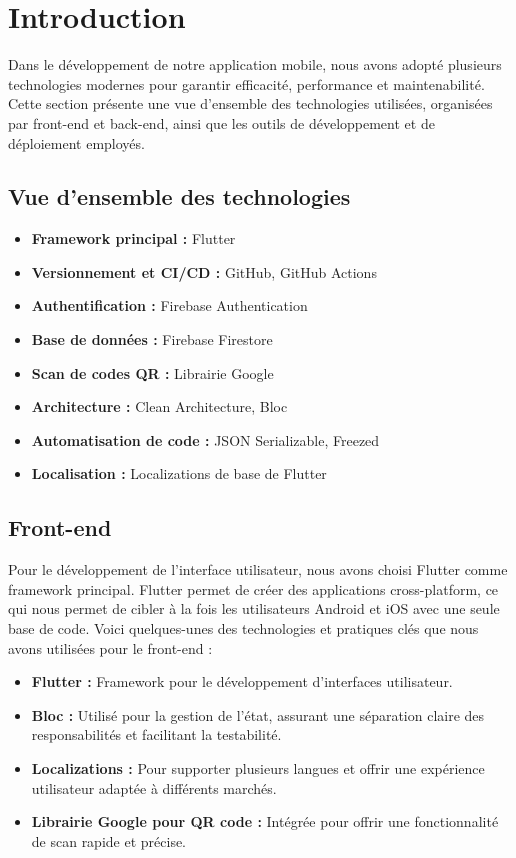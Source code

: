 \section{Introduction}

Dans le développement de notre application mobile, nous avons adopté plusieurs technologies modernes pour garantir efficacité, performance et maintenabilité. Cette section présente une vue d'ensemble des technologies utilisées, organisées par front-end et back-end, ainsi que les outils de développement et de déploiement employés.

\subsection{Vue d'ensemble des technologies}

\begin{itemize}[noitemsep]
    \item \textbf{Framework principal :} Flutter
    \item \textbf{Versionnement et CI/CD :} GitHub, GitHub Actions
    \item \textbf{Authentification :} Firebase Authentication
    \item \textbf{Base de données :} Firebase Firestore
    \item \textbf{Scan de codes QR :} Librairie Google
    \item \textbf{Architecture :} Clean Architecture, Bloc
    \item \textbf{Automatisation de code :} JSON Serializable, Freezed
    \item \textbf{Localisation :} Localizations de base de Flutter
\end{itemize}

\subsection{Front-end}

Pour le développement de l'interface utilisateur, nous avons choisi Flutter comme framework principal. Flutter permet de créer des applications cross-platform, ce qui nous permet de cibler à la fois les utilisateurs Android et iOS avec une seule base de code. Voici quelques-unes des technologies et pratiques clés que nous avons utilisées pour le front-end :

\begin{itemize}[noitemsep]
    \item \textbf{Flutter :} Framework pour le développement d'interfaces utilisateur.
    \item \textbf{Bloc :} Utilisé pour la gestion de l'état, assurant une séparation claire des responsabilités et facilitant la testabilité.
    \item \textbf{Localizations :} Pour supporter plusieurs langues et offrir une expérience utilisateur adaptée à différents marchés.
    \item \textbf{Librairie Google pour QR code :} Intégrée pour offrir une fonctionnalité de scan rapide et précise.
\end{itemize}

